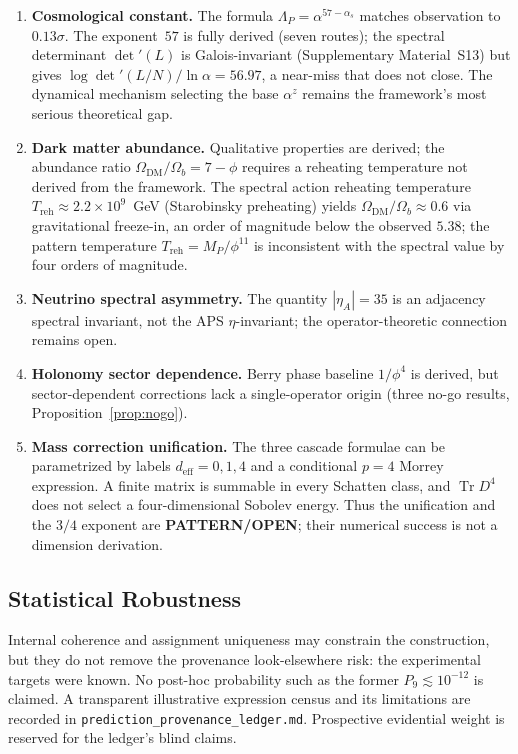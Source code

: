 \documentclass[12pt,a4paper]{article}
\theoremstyle{definition}
\begin{document}
\begin{enumerate}
\item \textbf{Cosmological constant.} The formula $\Lambda_P = \alpha^{57-\alpha_s}$ matches observation to $0.13\sigma$.  The exponent~$57$ is fully derived (seven routes); the spectral determinant $\det'(L)$ is Galois-invariant (Supplementary Material~S13) but gives $\log\det'(L/N)/\ln\alpha = 56.97$, a near-miss that does not close.  The dynamical mechanism selecting the base $\alpha^z$ remains the framework's most serious theoretical gap.
\item \textbf{Dark matter abundance.} Qualitative properties are derived; the abundance ratio $\Omega_{\text{DM}}/\Omega_b = 7-\phi$ requires a reheating temperature not derived from the framework.  The spectral action reheating temperature $T_{\text{reh}} \approx 2.2 \times 10^9$~GeV (Starobinsky preheating) yields $\Omega_{\text{DM}}/\Omega_b \approx 0.6$ via gravitational freeze-in, an order of magnitude below the observed $5.38$; the pattern temperature $T_{\text{reh}} = M_P/\phi^{11}$ is inconsistent with the spectral value by four orders of magnitude.
\item \textbf{Neutrino spectral asymmetry.} The quantity $|\eta_A| = 35$ is an adjacency spectral invariant, not the APS $\eta$-invariant; the operator-theoretic connection remains open.
\item \textbf{Holonomy sector dependence.} Berry phase baseline $1/\phi^4$ is derived, but sector-dependent corrections lack a single-operator origin (three no-go results, Proposition~\ref{prop:nogo}).
\item \textbf{Mass correction unification.} The three cascade formulae can be parametrized by labels $d_{\text{eff}}=0,1,4$ and a conditional $p=4$ Morrey expression.  A finite matrix is summable in every Schatten class, and $\operatorname{Tr}D^4$ does not select a four-dimensional Sobolev energy.  Thus the unification and the $3/4$ exponent are \textbf{PATTERN/OPEN}; their numerical success is not a dimension derivation.
\end{enumerate}

\subsection{Statistical Robustness}
\label{sec:statistics}

Internal coherence and assignment uniqueness may constrain the construction,
but they do not remove the provenance look-elsewhere risk: the experimental
targets were known.  No post-hoc probability such as the former
$P_9\lesssim10^{-12}$ is claimed.  A transparent illustrative expression
census and its limitations are recorded in
\texttt{prediction\_provenance\_ledger.md}.  Prospective evidential weight is
reserved for the ledger's blind claims.
\end{document}

